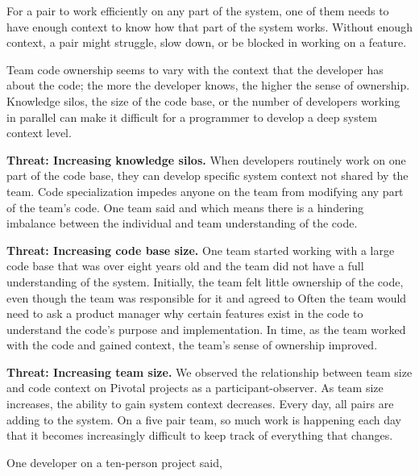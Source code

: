 For a pair to work efficiently on any part of the system, one of them needs to have enough context to know how that part of the system works. Without enough context, a pair might struggle, slow down, or be blocked in working on a feature.

Team code ownership seems to vary with the context that the developer has about the code; the more the developer knows, the higher the sense of ownership. Knowledge silos, the size of the code base, or the number of developers working in parallel can make it difficult for a programmer to develop a deep system context level.

\textbf{Threat: Increasing knowledge silos.} When developers routinely work on one part of the code base, they can develop specific system context not shared by the team. Code specialization impedes anyone on the team from modifying any part of the team's code.  One team said  and  which means there is a hindering imbalance between the individual and team understanding of the code.

\textbf{Threat: Increasing code base size.} One team started working with a large code base that was over eight years old and the team did not have a full understanding of the system. Initially, the team felt little ownership of the code, even though the team was responsible for it and agreed to  Often the team would need to ask a product manager why certain features exist in the code to understand the code's purpose and implementation. In time, as the team worked with the code and gained context, the team's sense of ownership improved.

\textbf{Threat: Increasing team size.} We observed the relationship between team size and code context on \numberOfObservedProjects{} Pivotal projects as a participant-observer. As team size increases, the ability to gain system context decreases. Every day, all pairs are adding to the system. On a five pair team, so much work is happening each day that it becomes increasingly difficult to keep track of everything that changes.

One developer on a ten-person project said, 

